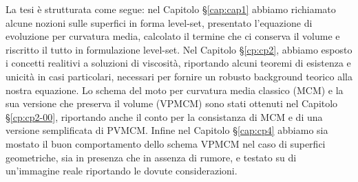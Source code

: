 La tesi è strutturata come segue: nel Capitolo §\ref{cap:cap1} abbiamo
richiamato alcune nozioni sulle superfici in forma level-set,
presentato l'equazione di evoluzione per curvatura media, calcolato il
termine che ci conserva il volume e riscritto il tutto in formulazione
level-set. Nel Capitolo §\ref{cp:cp2}, abbiamo esposto i concetti
realitivi a soluzioni di viscosità, riportando alcuni teoremi di
esistenza e unicità in casi particolari, necessari per fornire un
robusto background teorico alla nostra equazione. Lo schema del moto
per curvatura media classico (MCM) e la sua versione che preserva il
volume (VPMCM) sono stati ottenuti nel Capitolo §\ref{cp:cp2-00},
riportando anche il conto per la consistanza di MCM e di una versione
semplificata di PVMCM. Infine nel Capitolo §\ref{cap:cp4} abbiamo
sia mostato il buon comportamento dello schema VPMCM nel caso di superfici
geometriche, sia in presenza che in assenza di rumore, e testato su di
un'immagine reale riportando le dovute considerazioni. 
   
